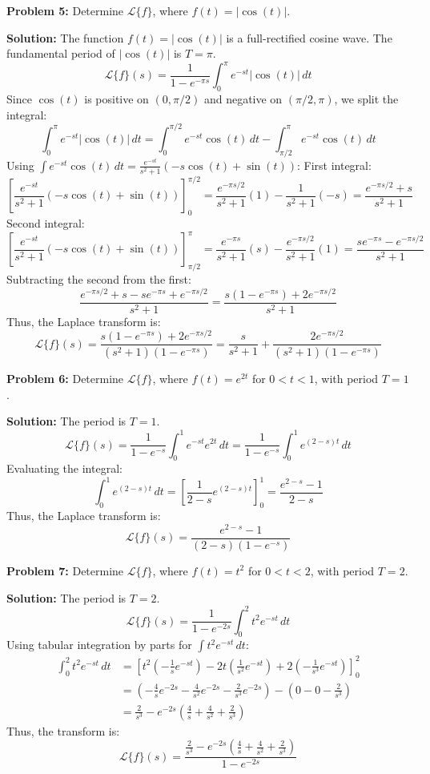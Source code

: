 \documentclass[11pt, letterpaper]{article}
\theoremstyle{definition}
\theoremstyle{remark}
\begin{document}
\vspace{1em}
\textbf{Problem 5:} Determine $\mathcal{L}\{f\}$, where $f(t) = |\cos(t)|$.

\textbf{Solution:}
The function $f(t) = |\cos(t)|$ is a full-rectified cosine wave. The fundamental period of $|\cos(t)|$ is $T = \pi$.
\[ \mathcal{L}\{f\}(s) = \frac{1}{1 - e^{-\pi s}} \int_0^\pi e^{-st} |\cos(t)| \,dt \]
Since $\cos(t)$ is positive on $(0, \pi/2)$ and negative on $(\pi/2, \pi)$, we split the integral:
\[ \int_0^\pi e^{-st} |\cos(t)| \,dt = \int_0^{\pi/2} e^{-st} \cos(t) \,dt - \int_{\pi/2}^\pi e^{-st} \cos(t) \,dt \]
Using $\int e^{-st} \cos(t) \,dt = \frac{e^{-st}}{s^2+1} (-s \cos(t) + \sin(t))$:
First integral:
\[ \left[ \frac{e^{-st}}{s^2+1} (-s \cos(t) + \sin(t)) \right]_0^{\pi/2} = \frac{e^{-\pi s / 2}}{s^2+1}(1) - \frac{1}{s^2+1}(-s) = \frac{e^{-\pi s / 2} + s}{s^2+1} \]
Second integral:
\[ \left[ \frac{e^{-st}}{s^2+1} (-s \cos(t) + \sin(t)) \right]_{\pi/2}^\pi = \frac{e^{-\pi s}}{s^2+1}(s) - \frac{e^{-\pi s / 2}}{s^2+1}(1) = \frac{s e^{-\pi s} - e^{-\pi s / 2}}{s^2+1} \]
Subtracting the second from the first:
\[ \frac{e^{-\pi s / 2} + s - s e^{-\pi s} + e^{-\pi s / 2}}{s^2+1} = \frac{s(1 - e^{-\pi s}) + 2e^{-\pi s / 2}}{s^2+1} \]
Thus, the Laplace transform is:
\[ \mathcal{L}\{f\}(s) = \frac{s(1 - e^{-\pi s}) + 2e^{-\pi s / 2}}{(s^2+1)(1 - e^{-\pi s})} = \frac{s}{s^2+1} + \frac{2e^{-\pi s / 2}}{(s^2+1)(1 - e^{-\pi s})} \]

\vspace{1em}
\textbf{Problem 6:} Determine $\mathcal{L}\{f\}$, where $f(t) = e^{2t}$ for $0 < t < 1$, with period $T = 1$.

\textbf{Solution:}
The period is $T = 1$.
\[ \mathcal{L}\{f\}(s) = \frac{1}{1 - e^{-s}} \int_0^1 e^{-st} e^{2t} \,dt = \frac{1}{1 - e^{-s}} \int_0^1 e^{(2-s)t} \,dt \]
Evaluating the integral:
\[ \int_0^1 e^{(2-s)t} \,dt = \left[ \frac{1}{2-s} e^{(2-s)t} \right]_0^1 = \frac{e^{2-s} - 1}{2-s} \]
Thus, the Laplace transform is:
\[ \mathcal{L}\{f\}(s) = \frac{e^{2-s} - 1}{(2-s)(1 - e^{-s})} \]

\vspace{1em}
\textbf{Problem 7:} Determine $\mathcal{L}\{f\}$, where $f(t) = t^2$ for $0 < t < 2$, with period $T = 2$.

\textbf{Solution:}
The period is $T = 2$.
\[ \mathcal{L}\{f\}(s) = \frac{1}{1 - e^{-2s}} \int_0^2 t^2 e^{-st} \,dt \]
Using tabular integration by parts for $\int t^2 e^{-st} \,dt$:
\begin{align*}
\int_0^2 t^2 e^{-st} \,dt &= \left[ t^2 \left(-\frac{1}{s}e^{-st}\right) - 2t \left(\frac{1}{s^2}e^{-st}\right) + 2 \left(-\frac{1}{s^3}e^{-st}\right) \right]_0^2 \\
&= \left( -\frac{4}{s}e^{-2s} - \frac{4}{s^2}e^{-2s} - \frac{2}{s^3}e^{-2s} \right) - \left( 0 - 0 - \frac{2}{s^3} \right) \\
&= \frac{2}{s^3} - e^{-2s} \left( \frac{4}{s} + \frac{4}{s^2} + \frac{2}{s^3} \right)
\end{align*}
Thus, the transform is:
\[ \mathcal{L}\{f\}(s) = \frac{\frac{2}{s^3} - e^{-2s} \left( \frac{4}{s} + \frac{4}{s^2} + \frac{2}{s^3} \right)}{1 - e^{-2s}} \]
\end{document}
